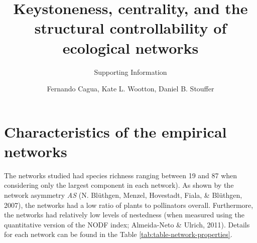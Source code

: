 \documentclass[a4paper]{artikel1}
\title{Keystoneness, centrality, and the structural controllability of
ecological networks}
\subtitle{Supporting Information}
\author{Fernando Cagua, Kate L. Wootton, Daniel B. Stouffer}
\date{}
\theoremstyle{definition}
\theoremstyle{definition}
\theoremstyle{definition}
\theoremstyle{remark}
\begin{document}
\maketitle

\renewcommand\thefigure{S\arabic{figure}}    

\setcounter{figure}{0}

\renewcommand\thetable{S\arabic{table}}    

\setcounter{table}{0}

\renewcommand{\thesection}{S\arabic{section}}

\setcounter{section}{0}

\doublespacing

\section{Characteristics of the empirical
networks}\label{empirical-networks}

The networks studied had species richness ranging between 19 and 87 when
considering only the largest component in each network). As shown by the
network asymmetry \emph{AS} (N. Blüthgen, Menzel, Hovestadt, Fiala, \&
Blüthgen, 2007), the networks had a low ratio of plants to pollinators
overall. Furthermore, the networks had relatively low levels of
nestedness (when measured using the quantitative version of the NODF
index; Almeida-Neto \& Ulrich, 2011). Details for each network can be
found in the Table \ref{tab:table-network-properties}.
\end{document}
